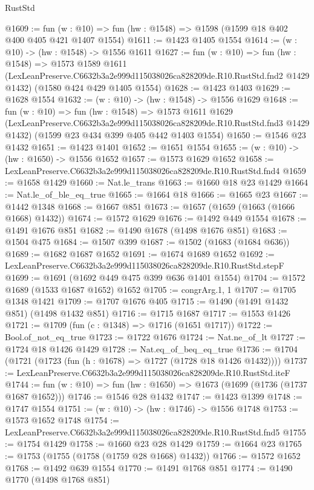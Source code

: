 \begin{lexlean}{RustStd}
\begin{coremodule}
@1609 := fun (w : @10) => fun (hw : @1548) => @1598 (@1599 @18 @402 @400 @405 @421 @1407 @1554)
@1611 := @1423 @1405 @1554
@1614 := (w : @10) -> (hw : @1548) -> @1556 @1611
@1627 := fun (w : @10) =>
  fun (hw : @1548) =>
  @1573
    @1589
    @1611
    (LexLeanPreserve.C6632b3a2e999d115038026ca828209de.R10.RustStd.fnd2 @1429 @1432)
    (@1580 @424 @429 @1405 @1554)
@1628 := @1423 @1403
@1629 := @1628 @1554
@1632 := (w : @10) -> (hw : @1548) -> @1556 @1629
@1648 := fun (w : @10) =>
  fun (hw : @1548) =>
  @1573
    @1611
    @1629
    (LexLeanPreserve.C6632b3a2e999d115038026ca828209de.R10.RustStd.fnd3 @1429 @1432)
    (@1599 @23 @434 @399 @405 @442 @1403 @1554)
@1650 := @1546 @23 @1432
@1651 := @1423 @1401
@1652 := @1651 @1554
@1655 := (w : @10) -> (hw : @1650) -> @1556 @1652
@1657 := @1573 @1629 @1652
@1658 := LexLeanPreserve.C6632b3a2e999d115038026ca828209de.R10.RustStd.fnd4
@1659 := @1658 @1429
@1660 := Nat.le_trans
@1663 := @1660 @18 @23 @1429
@1664 := Nat.le_of_ble_eq_true
@1665 := @1664 @18
@1666 := @1665 @23
@1667 := @1442 @1348
@1668 := @1667 @851
@1673 := @1657 (@1659 (@1663 (@1666 @1668) @1432))
@1674 := @1572 @1629
@1676 := @1492 @449 @1554
@1678 := @1491 @1676 @851
@1682 := @1490 @1678 (@1498 @1676 @851)
@1683 := @1504 @475
@1684 := @1507 @399
@1687 := @1502 (@1683 (@1684 @636))
@1689 := @1682 @1687 @1652
@1691 := @1674 @1689 @1652
@1692 := LexLeanPreserve.C6632b3a2e999d115038026ca828209de.R10.RustStd.stepF
@1699 := @1691 (@1692 @449 @475 @399 @636 @1401 @1554)
@1704 := @1572 @1689 (@1533 @1687 @1652) @1652
@1705 := congrArg.{1, 1}
@1707 := @1705 @1348 @1421
@1709 := @1707 @1676 @405
@1715 := @1490 (@1491 @1432 @851) (@1498 @1432 @851)
@1716 := @1715 @1687
@1717 := @1553 @1426
@1721 := @1709 (fun (c : @1348) => @1716 (@1651 @1717))
@1722 := Bool.of_not_eq_true
@1723 := @1722 @1676
@1724 := Nat.ne_of_lt
@1727 := @1724 @18 @1426 @1429
@1728 := Nat.eq_of_beq_eq_true
@1736 := @1704 (@1721 (@1723 (fun (h : @1678) => @1727 (@1728 @18 @1426 @1432))))
@1737 := LexLeanPreserve.C6632b3a2e999d115038026ca828209de.R10.RustStd.iteF
@1744 := fun (w : @10) => fun (hw : @1650) => @1673 (@1699 (@1736 (@1737 @1687 @1652)))
@1746 := @1546 @28 @1432
@1747 := @1423 @1399
@1748 := @1747 @1554
@1751 := (w : @10) -> (hw : @1746) -> @1556 @1748
@1753 := @1573 @1652 @1748
@1754 := LexLeanPreserve.C6632b3a2e999d115038026ca828209de.R10.RustStd.fnd5
@1755 := @1754 @1429
@1758 := @1660 @23 @28 @1429
@1759 := @1664 @23
@1765 := @1753 (@1755 (@1758 (@1759 @28 @1668) @1432))
@1766 := @1572 @1652
@1768 := @1492 @639 @1554
@1770 := @1491 @1768 @851
@1774 := @1490 @1770 (@1498 @1768 @851)

\end{coremodule}
\end{lexlean}
